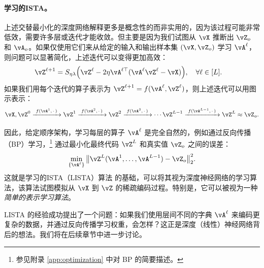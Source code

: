 \documentclass[../../book-main.tex]{subfiles}
\begin{document}
\paragraph{学习的ISTA。} 上述交替最小化的深度网络解释更多是概念性的而非实用的，因为该过程可能非常低效，需要许多层或迭代才能收敛。但主要是因为我们试图从 $\vX$ 推断出 $\vZ_o$ 和 $\vA_o$。如果仅使用它们来从给定的输入和输出样本集 $(\vX, \vZ_o)$ 学习 $\vA^\ell$，则问题可以显著简化，上述迭代可以变得更加高效：
\begin{align}
    & \vZ^{\ell + 1} = S_{\eta\lambda}\rp{\vZ^{\ell} - 2\eta\vA^{\ell\top}(\vA^\ell\vZ^{\ell} - \vX)}, \quad \forall \ell \in [L].
\end{align}
如果我们用每个迭代的算子表示为 $\vZ^{\ell + 1} = f(\vA^\ell, \vZ^\ell)$，则上述迭代可以用图示表示：
\begin{equation*}
\vX, \vZ^0 \xrightarrow{\hspace{1mm} f(\vA^1,\,\cdot\,) \hspace{1mm}}  \vZ^1 \xrightarrow{\hspace{1mm} f(\vA^2,\,\cdot\,) \hspace{1mm}}  \vZ^2  \xrightarrow{\hspace{1mm} f(\vA^3,\,\cdot\,) \hspace{1mm}} \cdots \vZ^{L-1}  \xrightarrow{\hspace{1mm} f(\vA^{L-1},\,\cdot\,) \hspace{1mm}} \vZ^L \approx \vZ_o.  
\label{eqn:deep-sparse-encoding}
\end{equation*}

因此，给定顺序架构，学习每层的算子 \(\vA^\ell\) 是完全自然的，例如通过反向传播（BP）学习，\footnote{参见附录 \ref{app:optimization} 中对 BP 的简要描述。} 通过最小化最终代码 $\vZ^L$ 和真实值 $\vZ_o$ 之间的误差：
\begin{equation}
    \min_{\{\vA^\ell\}} \big\|\vZ^L(\vA^1, \ldots, \vA^{L-1}) - \vZ_o\big\|_2^2.
\end{equation}
这就是学习的ISTA（LISTA）算法 \cite{gregor2010learning} 的基础，可以将其视为深度神经网络的学习算法，该算法试图模拟从 $\vX$ 到 $\vZ$ 的稀疏编码过程。特别是，它可以被视为一种 \textit{简单的表示学习算法}。

LISTA 的经验成功提出了一个问题：如果我们使用层间不同的字典 \(\vA^\ell\) 来编码更复杂的数据，并通过反向传播学习权重，会怎样？这正是深度（线性）神经网络背后的想法。我们将在后续章节中进一步讨论。

\end{document}
